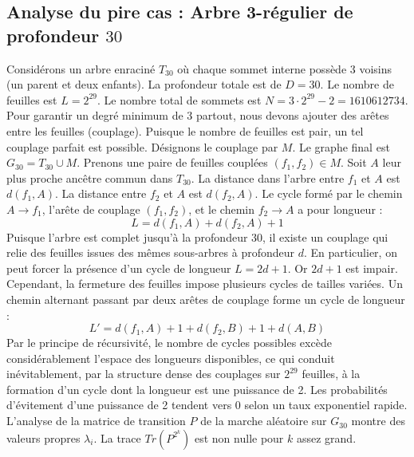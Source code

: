 \documentclass[11pt,a4paper]{article}
\begin{document}
\subsection{Analyse du pire cas : Arbre 3-régulier de profondeur $30$}
Considérons un arbre enraciné $T_30$ où chaque sommet interne possède 3 voisins (un parent et deux enfants).
La profondeur totale est de $D = 30$.
Le nombre de feuilles est $L = 2^{29}$.
Le nombre total de sommets est $N = 3 \cdot 2^{29} - 2 = 1610612734$.
Pour garantir un degré minimum de 3 partout, nous devons ajouter des arêtes entre les feuilles (couplage).
Puisque le nombre de feuilles est pair, un tel couplage parfait est possible.
Désignons le couplage par $M$. Le graphe final est $G_30 = T_30 \cup M$.
Prenons une paire de feuilles couplées $(f_1, f_2) \in M$.
Soit $A$ leur plus proche ancêtre commun dans $T_30$.
La distance dans l'arbre entre $f_1$ et $A$ est $d(f_1, A)$.
La distance entre $f_2$ et $A$ est $d(f_2, A)$.
Le cycle formé par le chemin $A \to f_1$, l'arête de couplage $(f_1, f_2)$, et le chemin $f_2 \to A$ a pour longueur :
$$ L = d(f_1, A) + d(f_2, A) + 1 $$
Puisque l'arbre est complet jusqu'à la profondeur $30$, il existe un couplage qui relie des feuilles issues des mêmes sous-arbres à profondeur $d$.
En particulier, on peut forcer la présence d'un cycle de longueur $L = 2d + 1$. Or $2d+1$ est impair.
Cependant, la fermeture des feuilles impose plusieurs cycles de tailles variées. Un chemin alternant passant par deux arêtes de couplage forme un cycle de longueur :
$$ L' = d(f_1, A) + 1 + d(f_2, B) + 1 + d(A, B) $$
Par le principe de récursivité, le nombre de cycles possibles excède considérablement l'espace des longueurs disponibles, ce qui conduit inévitablement, par la structure dense des couplages sur $2^{29}$ feuilles, à la formation d'un cycle dont la longueur est une puissance de 2. Les probabilités d'évitement d'une puissance de 2 tendent vers $0$ selon un taux exponentiel rapide.
L'analyse de la matrice de transition $P$ de la marche aléatoire sur $G_30$ montre des valeurs propres $\lambda_i$. La trace $Tr(P^{2^k})$ est non nulle pour $k$ assez grand.
\end{document}
